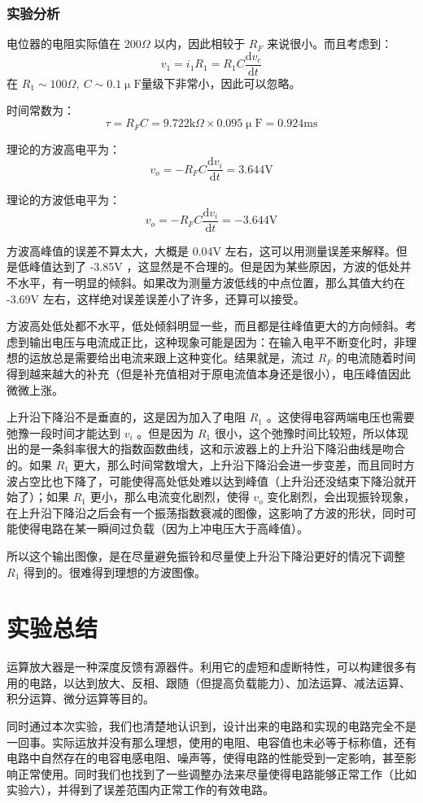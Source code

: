 \documentclass[a4paper,11pt,UTF8]{ctexart}
\newcommand\mr[1]{\mathrm{#1}}
\newcommand\dd{\mathrm{d}}
\begin{document}
\subsubsection{实验分析}
电位器的电阻实际值在 $200\Omega$ 以内，因此相较于 $R_F$ 来说很小。而且考虑到：
\[ v_1=i_1R_1=R_1C\frac{\dd v_c}{\dd t} \]
在 $R_1\sim100\Omega,~C\sim0.1\mr{\upmu F}$量级下非常小，因此可以忽略。
\par 时间常数为：
\[ \tau=R_FC=9.722\mr{k}\Omega\times0.095\mr{\upmu F}=0.924\mr{ms} \]
\par 理论的方波高电平为：
\[ v_o=-R_FC\frac{\dd v_i}{\dd t}=3.644\mr{V} \]
\par 理论的方波低电平为：
\[ v_o=-R_FC\frac{\dd v_i}{\dd t}=-3.644\mr{V} \]
\par 方波高峰值的误差不算太大，大概是 0.04V 左右，这可以用测量误差来解释。但是低峰值达到了 -3.85V ，这显然是不合理的。但是因为某些原因，方波的低处并不水平，有一明显的倾斜。如果改为测量方波低线的中点位置，那么其值大约在 -3.69V 左右，这样绝对误差误差小了许多，还算可以接受。
\par 方波高处低处都不水平，低处倾斜明显一些，而且都是往峰值更大的方向倾斜。考虑到输出电压与电流成正比，这种现象可能是因为：在输入电平不断变化时，非理想的运放总是需要给出电流来跟上这种变化。结果就是，流过 $R_F$ 的电流随着时间得到越来越大的补充（但是补充值相对于原电流值本身还是很小），电压峰值因此微微上涨。
\par 上升沿下降沿不是垂直的，这是因为加入了电阻 $R_1$ 。这使得电容两端电压也需要弛豫一段时间才能达到 $v_i$ 。但是因为 $R_1$ 很小，这个弛豫时间比较短，所以体现出的是一条斜率很大的指数函数曲线，这和示波器上的上升沿下降沿曲线是吻合的。如果 $R_1$ 更大，那么时间常数增大，上升沿下降沿会进一步变差，而且同时方波占空比也下降了，可能使得高处低处难以达到峰值（上升沿还没结束下降沿就开始了）；如果 $R_1$ 更小，那么电流变化剧烈，使得 $v_o$ 变化剧烈，会出现振铃现象，在上升沿下降沿之后会有一个振荡指数衰减的图像，这影响了方波的形状，同时可能使得电路在某一瞬间过负载（因为上冲电压大于高峰值）。
\par 所以这个输出图像，是在尽量避免振铃和尽量使上升沿下降沿更好的情况下调整 $R_1$ 得到的。很难得到理想的方波图像。

\section{实验总结}
运算放大器是一种深度反馈有源器件。利用它的虚短和虚断特性，可以构建很多有用的电路，以达到放大、反相、跟随（但提高负载能力）、加法运算、减法运算、积分运算、微分运算等目的。
\par 同时通过本次实验，我们也清楚地认识到，设计出来的电路和实现的电路完全不是一回事。实际运放并没有那么理想，使用的电阻、电容值也未必等于标称值，还有电路中自然存在的电容电感电阻、噪声等，使得电路的性能受到一定影响，甚至影响正常使用。同时我们也找到了一些调整办法来尽量使得电路能够正常工作（比如实验六），并得到了误差范围内正常工作的有效电路。
\end{document}
